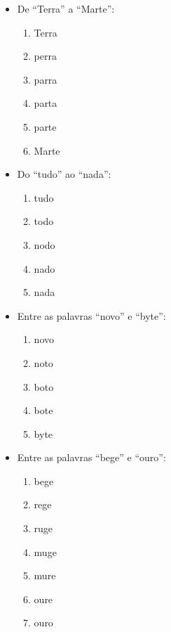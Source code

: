 \documentclass[portuguese,11pt,a4paper,titlepage]{article}
\begin{document}
\begin{multicols}{2}
\begin{itemize}
\item De ``Terra'' a ``Marte'':
	\begin{enumerate}
		\item Terra
		\item perra
		\item parra
		\item parta
		\item parte
		\item Marte
	\end{enumerate}
\item Do ``tudo'' ao ``nada'':
	\begin{enumerate}
		\item tudo
		\item todo
		\item nodo
		\item nado
		\item nada
	\end{enumerate}
\item Entre as palavras ``novo'' e ``byte'':
	\begin{enumerate}
		\itemsep 0em
		\item novo
		\item noto
		\item boto
		\item bote
		\item byte
	\end{enumerate}
	\item Entre as palavras ``bege'' e ``ouro'':
	\begin{enumerate}
		\itemsep 0em
			\item bege
			\item rege
			\item ruge
			\item muge
			\item mure
			\item oure
			\item ouro
	\end{enumerate}
\end{itemize}
\end{multicols}
\pagebreak
\end{document}
